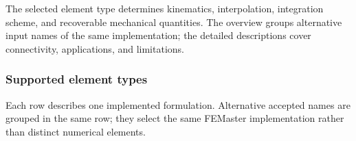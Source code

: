 
The selected element type determines kinematics, interpolation,
integration scheme, and recoverable mechanical quantities. The overview
groups alternative input names of the same implementation; the detailed
descriptions cover connectivity, applications, and limitations.

\subsubsection{Supported element types}
\label{sec:elements}

Each row describes one implemented formulation. Alternative accepted
 names are grouped in the same row; they select the same
FEMaster implementation rather than distinct numerical elements.

